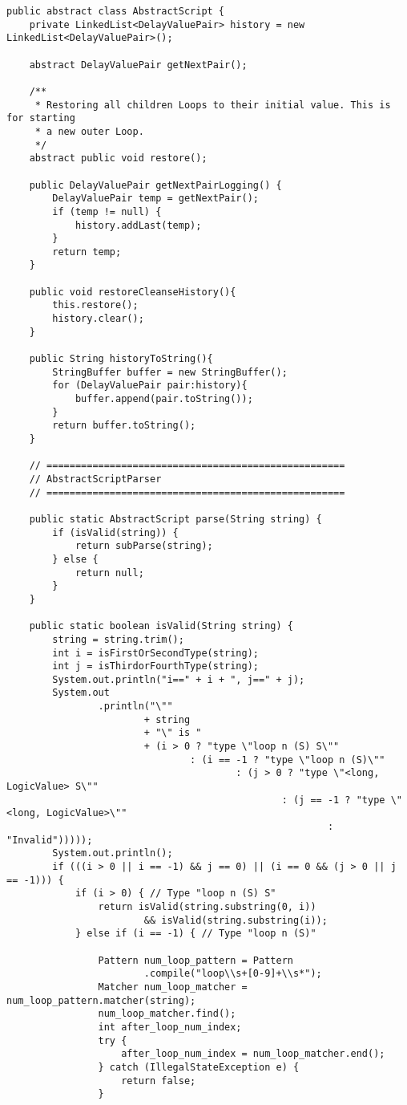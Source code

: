 \begin{lstlisting}[caption=ElementDictionary, label=listing7]
public abstract class AbstractScript {
	private LinkedList<DelayValuePair> history = new LinkedList<DelayValuePair>();

	abstract DelayValuePair getNextPair();

	/**
	 * Restoring all children Loops to their initial value. This is for starting
	 * a new outer Loop.
	 */
	abstract public void restore();

	public DelayValuePair getNextPairLogging() {
		DelayValuePair temp = getNextPair();
		if (temp != null) {
			history.addLast(temp);
		}
		return temp;
	}
	
	public void restoreCleanseHistory(){
		this.restore();
		history.clear();
	}
	
	public String historyToString(){
		StringBuffer buffer = new StringBuffer();
		for (DelayValuePair pair:history){
			buffer.append(pair.toString());
		}
		return buffer.toString();
	}

	// ====================================================
	// AbstractScriptParser
	// ====================================================

	public static AbstractScript parse(String string) {
		if (isValid(string)) {
			return subParse(string);
		} else {
			return null;
		}
	}

	public static boolean isValid(String string) {
		string = string.trim();
		int i = isFirstOrSecondType(string);
		int j = isThirdorFourthType(string);
		System.out.println("i==" + i + ", j==" + j);
		System.out
				.println("\""
						+ string
						+ "\" is "
						+ (i > 0 ? "type \"loop n (S) S\""
								: (i == -1 ? "type \"loop n (S)\""
										: (j > 0 ? "type \"<long, LogicValue> S\""
												: (j == -1 ? "type \"<long, LogicValue>\""
														: "Invalid")))));
		System.out.println();
		if (((i > 0 || i == -1) && j == 0) || (i == 0 && (j > 0 || j == -1))) {
			if (i > 0) { // Type "loop n (S) S"
				return isValid(string.substring(0, i))
						&& isValid(string.substring(i));
			} else if (i == -1) { // Type "loop n (S)"

				Pattern num_loop_pattern = Pattern
						.compile("loop\\s+[0-9]+\\s*");
				Matcher num_loop_matcher = num_loop_pattern.matcher(string);
				num_loop_matcher.find();
				int after_loop_num_index;
				try {
					after_loop_num_index = num_loop_matcher.end();
				} catch (IllegalStateException e) {
					return false;
				}


\end{lstlisting}
